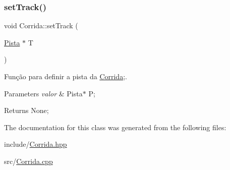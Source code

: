 \subsubsection{\texorpdfstring{set\+Track()}{setTrack()}}
{\footnotesize\ttfamily void Corrida\+::set\+Track (\begin{DoxyParamCaption}\item[{\mbox{\hyperlink{class_pista}{Pista}} $\ast$}]{T }\end{DoxyParamCaption})}



Função para definir a pista da \mbox{\hyperlink{class_corrida}{Corrida}};. 


\begin{DoxyParams}{Parameters}
{\em valor} & Pista$\ast$ P; \\
\hline
\end{DoxyParams}
\begin{DoxyReturn}{Returns}
None; 
\end{DoxyReturn}


The documentation for this class was generated from the following files\+:\begin{DoxyCompactItemize}
\item 
include/\mbox{\hyperlink{_corrida_8hpp}{Corrida.\+hpp}}\item 
src/\mbox{\hyperlink{_corrida_8cpp}{Corrida.\+cpp}}\end{DoxyCompactItemize}
